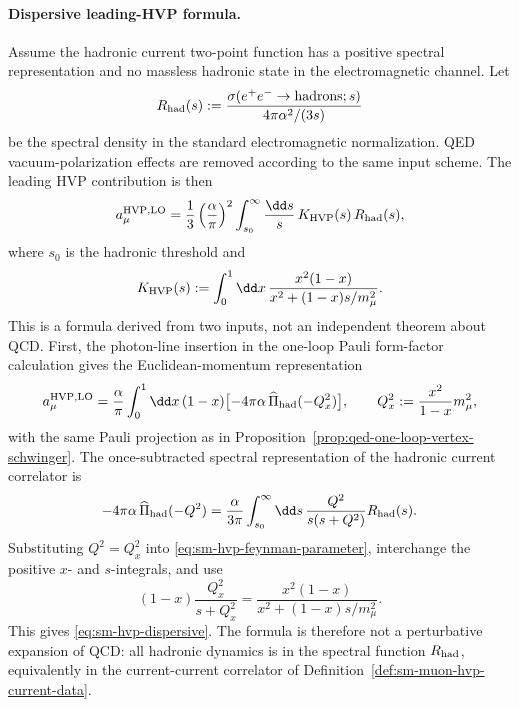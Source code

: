 \paragraph{Dispersive leading-HVP formula.}
Assume the hadronic current two-point function has a positive spectral
representation and no massless hadronic state in the electromagnetic channel.
Let
\begin{equation}
  R_{\rm had}(s):=
  \frac{\sigma(e^+e^-\to{\rm hadrons};s)}
       {4\pi\alpha^2/(3s)}
  \label{eq:sm-rhad-definition}
\end{equation}
be the spectral density in the standard electromagnetic normalization.  QED
vacuum-polarization effects are removed according to the same input scheme.
The leading HVP contribution is then
\begin{equation}
  a_\mu^{\rm HVP,LO}
  =
  \frac13\left(\frac{\alpha}{\pi}\right)^2
  \int_{s_0}^{\infty}\frac{\dd s}{s}\,
  K_{\rm HVP}(s)\,R_{\rm had}(s),
  \label{eq:sm-hvp-dispersive}
\end{equation}
where \(s_0\) is the hadronic threshold and
\begin{equation}
  K_{\rm HVP}(s)
  :=
  \int_0^1\dd x\,
  \frac{x^2(1-x)}
       {x^2+(1-x)s/m_\mu^2}.
  \label{eq:sm-hvp-kernel}
\end{equation}
This is a formula derived from two inputs, not an independent theorem about
QCD.  First, the photon-line insertion in the one-loop Pauli form-factor
calculation gives
the Euclidean-momentum representation
\begin{equation}
  a_\mu^{\rm HVP,LO}
  =
  \frac{\alpha}{\pi}
  \int_0^1\dd x\,(1-x)
  \bigl[-4\pi\alpha\,\widehat\Pi_{\rm had}(-Q_x^2)\bigr],
  \qquad
  Q_x^2:=\frac{x^2}{1-x}m_\mu^2,
  \label{eq:sm-hvp-feynman-parameter}
\end{equation}
with the same Pauli projection as in
Proposition~\ref{prop:qed-one-loop-vertex-schwinger}.  The once-subtracted
spectral representation of the hadronic current correlator is
\begin{equation}
  -4\pi\alpha\,\widehat\Pi_{\rm had}(-Q^2)
  =
  \frac{\alpha}{3\pi}
  \int_{s_0}^{\infty}\dd s\,
  \frac{Q^2}{s(s+Q^2)}R_{\rm had}(s).
  \label{eq:sm-hvp-subtracted-dispersion}
\end{equation}
Substituting \(Q^2=Q_x^2\) into
\eqref{eq:sm-hvp-feynman-parameter}, interchange the positive \(x\)- and
\(s\)-integrals, and use
\[
  (1-x)\frac{Q_x^2}{s+Q_x^2}
  =
  \frac{x^2(1-x)}
       {x^2+(1-x)s/m_\mu^2}.
\]
This gives \eqref{eq:sm-hvp-dispersive}.  The formula is therefore not a
perturbative expansion of QCD: all hadronic dynamics is in the spectral
function \(R_{\rm had}\), equivalently in the current-current correlator of
Definition~\ref{def:sm-muon-hvp-current-data}.

